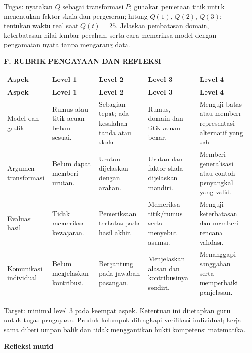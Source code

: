 \documentclass[11pt,a4paper]{article}
\begin{document}
Tugas: nyatakan \(Q\) sebagai transformasi \(P\); gunakan pemetaan titik untuk menentukan faktor skala dan pergeseran; hitung \(Q(1)\), \(Q(2)\), \(Q(3)\); tentukan waktu real saat \(Q(t)=25\). Jelaskan pembatasan domain, keterbatasan nilai lembar pecahan, serta cara memeriksa model dengan pengamatan nyata tanpa mengarang data.\par\medskip
\clearpage
\begin{center}\bfseries\large F. RUBRIK PENGAYAAN DAN REFLEKSI\end{center}\medskip
{\small\setlength{\tabcolsep}{2mm}\renewcommand{\arraystretch}{1.35}\begin{longtable}{|>{\raggedright\arraybackslash}p{27.873mm}|>{\raggedright\arraybackslash}p{26.606mm}|>{\raggedright\arraybackslash}p{29.140mm}|>{\raggedright\arraybackslash}p{35.474mm}|>{\raggedright\arraybackslash}p{38.008mm}|}\hline
\rowcolor{gray!10}\textbf{Aspek} & \textbf{Level 1} & \textbf{Level 2} & \textbf{Level 3} & \textbf{Level 4}\\ \hline
\endfirsthead
\rowcolor{gray!10}\textbf{Aspek} & \textbf{Level 1} & \textbf{Level 2} & \textbf{Level 3} & \textbf{Level 4}\\ \hline
\endhead
Model dan grafik & Rumus atau titik acuan belum sesuai. & Sebagian tepat; ada kesalahan tanda atau skala. & Rumus, domain dan titik acuan benar. & Menguji batas atau memberi representasi alternatif yang sah.\\ \hline
Argumen transformasi & Belum dapat memberi urutan. & Urutan dijelaskan dengan arahan. & Urutan dan faktor skala dijelaskan mandiri. & Memberi generalisasi atau contoh penyangkal yang valid.\\ \hline
Evaluasi hasil & Tidak memeriksa kewajaran. & Pemeriksaan terbatas pada hasil akhir. & Memeriksa titik/rumus serta menyebut asumsi. & Menguji keterbatasan dan memberi rencana validasi.\\ \hline
Komunikasi individual & Belum menjelaskan kontribusi. & Bergantung pada jawaban pasangan. & Menjelaskan alasan dan kontribusinya sendiri. & Menanggapi sanggahan serta memperbaiki penjelasan.\\ \hline
\end{longtable}}\medskip
{\small Target: minimal level 3 pada keempat aspek. Ketentuan ini ditetapkan guru untuk tugas pengayaan. Produk kelompok dilengkapi verifikasi individual; kerja sama diberi umpan balik dan tidak menggantikan bukti kompetensi matematika.\par}\medskip
\par\medskip\noindent\textbf{Refleksi murid}\par\smallskip
\end{document}
